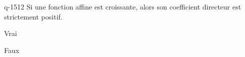 \begin{truefalse}{q-1512}
Si une fonction affine est croissante, alors son coefficient directeur est strictement positif.
\item Vrai
\item* Faux
\end{truefalse}

